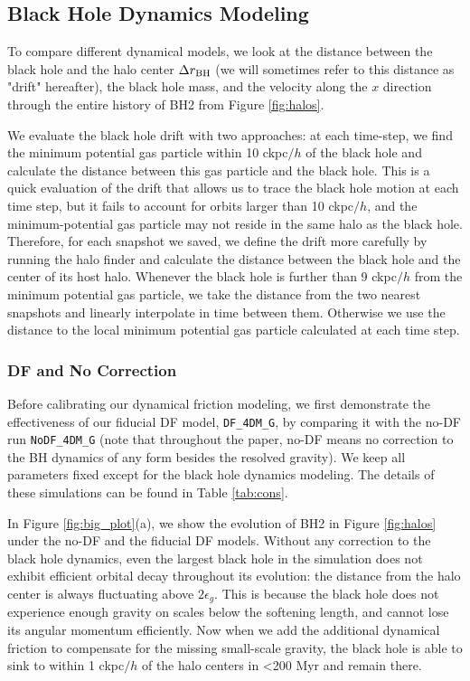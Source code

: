 \subsection{Black Hole Dynamics Modeling}
\label{subsec:models}

To compare different dynamical models, we look at the distance between the black hole and the halo center $\Delta r_{\rm BH}$ (we will sometimes refer to this distance as "drift" hereafter), the black hole mass, and the velocity along the $x$ direction through the entire history of BH2 from Figure \ref{fig:halos}. 
 
 We evaluate the black hole drift with two approaches: at each time-step, we find the minimum potential gas particle within 10 ckpc$/h$ of the black hole and calculate the distance between this gas particle and the black hole. This is a quick evaluation of the drift that allows us to trace the black hole motion at each time step, but it fails to account for orbits larger than 10 ckpc$/h$, and the minimum-potential gas particle may not reside in the same halo as the black hole. Therefore, for each snapshot we saved, we define the drift more carefully by running the halo finder and calculate the distance between the black hole and the center of its host halo. Whenever the black hole is further than 9 ckpc$/h$ from the minimum potential gas particle, we take the distance from the two nearest snapshots and linearly interpolate in time between them. Otherwise we use the 
 distance to the local minimum potential gas particle calculated at each time step.

\subsubsection{DF and No Correction}

Before calibrating our dynamical friction modeling, we first demonstrate the effectiveness of our fiducial DF model, \texttt{DF\_4DM\_G}, by comparing it with the no-DF run \texttt{NoDF\_4DM\_G} (note that throughout the paper, no-DF means no correction to the BH dynamics of any form besides the resolved gravity). We keep all parameters fixed except for the black hole dynamics modeling. The details of these simulations can be found in Table \ref{tab:cons}.

In Figure \ref{fig:big_plot}(a), we show the evolution of BH2 in Figure \ref{fig:halos} under the no-DF and the fiducial DF models. Without any correction to the black hole dynamics, even the largest black hole in the simulation does not exhibit efficient orbital decay throughout its evolution: the distance from the halo center is always fluctuating above $2\epsilon_g$. This is because the black hole does not experience enough gravity on scales below the softening length, and cannot lose its angular momentum efficiently. Now when we add the additional dynamical friction to compensate for the missing small-scale gravity, the black hole is able to sink to within 1 ckpc$/h$ of the halo centers in <200 Myr and remain there. 

